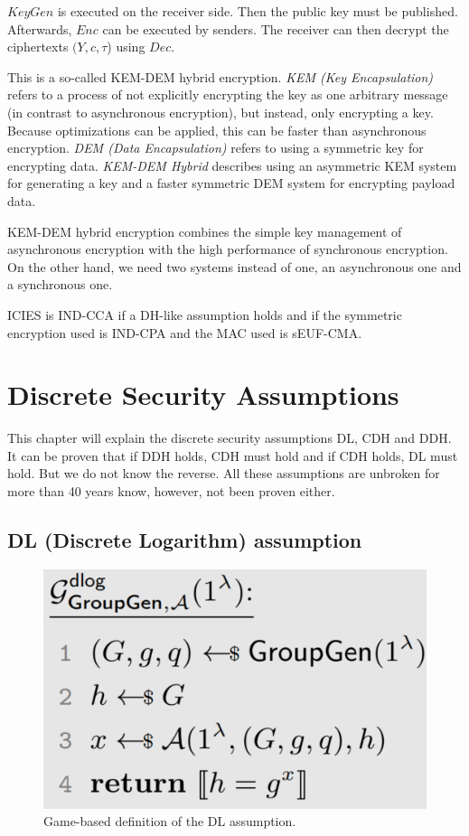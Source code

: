$KeyGen$ is executed on the receiver side.
Then the public key must be published.
Afterwards, $Enc$ can be executed by senders.
The receiver can then decrypt the ciphertexts $(Y, c, \tau$) using $Dec$.

This is a so-called KEM-DEM hybrid encryption.
\textit{KEM (Key Encapsulation)} refers to a process of not explicitly encrypting the key as one arbitrary message (in contrast to asynchronous encryption), but instead, only encrypting a key. Because optimizations can be applied, this can be faster than asynchronous encryption.
\textit{DEM (Data Encapsulation)} refers to using a symmetric key for encrypting data.
\textit{KEM-DEM Hybrid} describes using an asymmetric KEM system for generating a key and a faster symmetric DEM system for encrypting payload data.

KEM-DEM hybrid encryption combines the simple key management of asynchronous encryption with the high performance of synchronous encryption.
On the other hand, we need two systems instead of one, an asynchronous one and a synchronous one.

ICIES is IND-CCA if a DH-like assumption holds and if the symmetric encryption used is IND-CPA and the MAC used is sEUF-CMA.

\section{Discrete Security Assumptions}

This chapter will explain the discrete security assumptions DL, CDH and DDH.
It can be proven that if DDH holds, CDH must hold and if CDH holds, DL must hold.
But we do not know the reverse.
All these assumptions are unbroken for more than 40 years know, however, not been proven either.

\subsection{DL (Discrete Logarithm) assumption}

\begin{figure}
    \center
    \includegraphics[width=\linewidth]{gfx/discrete_log_assumption.png}
    \caption{Game-based definition of the DL assumption.}
    \label{fig:DL_assumption}
\end{figure}

